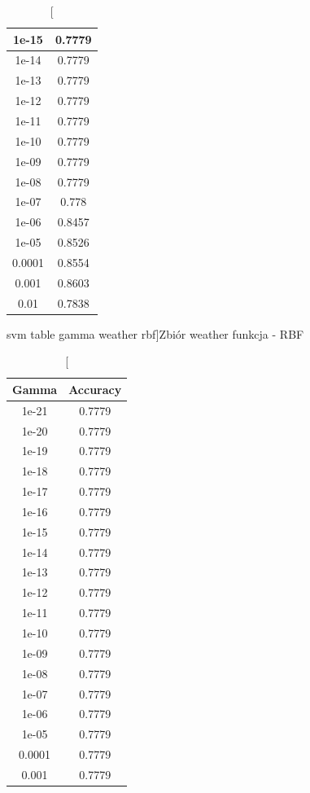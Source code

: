 \documentclass{classrep}
\begin{document}
{{\begin{table}[!htbp]
\begin{minipage}{.3\textwidth}
\begin{tabular}{|c|c|}
1e-15 & 0.7779 \\ \hline
1e-14 & 0.7779 \\ \hline
1e-13 & 0.7779 \\ \hline
1e-12 & 0.7779 \\ \hline
1e-11 & 0.7779 \\ \hline
1e-10 & 0.7779 \\ \hline
1e-09 & 0.7779 \\ \hline
1e-08 & 0.7779 \\ \hline
1e-07 & 0.778 \\ \hline
1e-06 & 0.8457 \\ \hline
1e-05 & 0.8526 \\ \hline
0.0001 & 0.8554 \\ \hline
0.001 & 0.8603 \\ \hline
0.01 & 0.7838 \\ \hline
        \end{tabular}
        \caption
		[svm table gamma weather rbf]{Zbiór weather funkcja - RBF}
        \label{svn_table_gamma_weather_rbf}
    \end{minipage}
    \hfill
    \begin{minipage}{.3\textwidth}
        \centering
        \begin{tabular}{|c|c|}
            \hline
			Gamma & Accuracy \\ \hline
1e-21 & 0.7779 \\ \hline
1e-20 & 0.7779 \\ \hline
1e-19 & 0.7779 \\ \hline
1e-18 & 0.7779 \\ \hline
1e-17 & 0.7779 \\ \hline
1e-16 & 0.7779 \\ \hline
1e-15 & 0.7779 \\ \hline
1e-14 & 0.7779 \\ \hline
1e-13 & 0.7779 \\ \hline
1e-12 & 0.7779 \\ \hline
1e-11 & 0.7779 \\ \hline
1e-10 & 0.7779 \\ \hline
1e-09 & 0.7779 \\ \hline
1e-08 & 0.7779 \\ \hline
1e-07 & 0.7779 \\ \hline
1e-06 & 0.7779 \\ \hline
1e-05 & 0.7779 \\ \hline
0.0001 & 0.7779 \\ \hline
0.001 & 0.7779 \\ \hline

\end{tabular}
\end{minipage}
\end{table}}}
\end{document}
